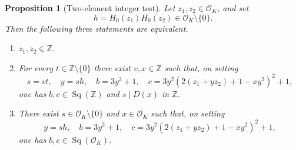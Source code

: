 \documentclass[12pt]{amsart}
\numberwithin{equation}{section}
\newtheorem{proposition}[theorem]{Proposition}
\theoremstyle{remark}
\theoremstyle{plain}
\newcommand{\Z}{\mathbb{Z}}
\newcommand{\sO}{\mathcal{O}}
\newcommand{\Sq}[1]{\operatorname{Sq}(#1)}
\begin{document}
\begin{proposition}[Two-element integer test]\label{prop:imag-two-element}
Let $z_1,z_2\in\sO_K$, and set
\[
h=H_0(z_1)H_0(z_2)\in\sO_K\setminus\{0\}.
\]
Then the following three statements are equivalent.
\begin{enumerate}[label=\textup{(\arabic*)}]
\item $z_1,z_2\in\Z$.

\item For every $t\in\Z\setminus\{0\}$ there exist $v,x\in\Z$ such that, on setting
\[
s=vt,\quad y=sh,\quad b=3y^2+1,\quad c=3y^2\left(2(z_1+yz_2)+1-xy^2\right)^2+1,
\]
one has $b,c\in\Sq{\Z}$ and $s\mid D(x)$ in $\Z$.

\item There exist $s\in\sO_K\setminus\{0\}$ and $x\in\sO_K$ such that, on setting
\[
y=sh,\quad b=3y^2+1,\quad c=3y^2\left(2(z_1+yz_2)+1-xy^2\right)^2+1,
\]
one has $b,c\in\Sq{\sO_K}$.
\end{enumerate}
\end{proposition}
\end{document}
